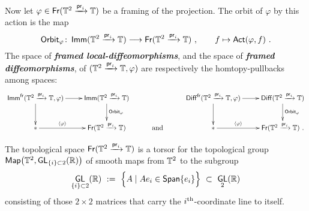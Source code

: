 \documentclass{amsart}
\theoremstyle{definition}
\theoremstyle{remark}
\DeclareMathOperator{\pr}{\mathsf{pr}}
\DeclareMathOperator{\Map}{{\sf Map}}
\newcommand{\bit}[1]{\textbf{\textit{#1}}}
\DeclareMathOperator{\Diff}{{\sf Diff}}
\newcommand{\lag}{\langle}
\newcommand{\rag}{\rangle}
\newcommand{\xra}{\xrightarrow}
\DeclareMathOperator{\GL}{\sf GL}
\DeclareMathOperator{\Fr}{\sf Fr}
\DeclareMathOperator{\Act}{\sf Act}
\DeclareMathOperator{\Imm}{\sf Imm}
\begin{document}
Now let $\varphi \in \Fr(\TT^2 \xra{\pr_i} \TT)$ be a framing of the projection.
The orbit of $\varphi$ by this action is the map
\[
{\sf Orbit}_\varphi
\colon 
\Imm(\TT^2 \xra{\pr_i}\TT)
\longrightarrow
\Fr(\TT^2 \xra{\pr_i} \TT)
~,\qquad
f\mapsto \Act(\varphi,f)
~.
\]
The space of \bit{framed local-diffeomorphisms}, and the space of \bit{framed diffeomorphisms}, of $(\TT^2 \xra{\pr_i} \TT , \varphi)$ are respectively the homtopy-pullbacks among spaces:
\[
\xymatrix{
\Imm^{\sf fr}(\TT^2\xra{\pr_i} \TT,\varphi)
\ar[r]
\ar[d]
&
\Imm(\TT^2\xra{\pr_i} \TT)
\ar[d]^-{{\sf Orbit}_\varphi}
&&
\Diff^{\sf fr}(\TT^2 \xra{\pr_i} \TT,\varphi)
\ar[r]
\ar[d]
&
\Diff(\TT^2\xra{\pr_i} \TT)
\ar[d]^-{{\sf Orbit}_\varphi}
\\
\ast
\ar[r]^-{\lag \varphi \rag}
&
\Fr(\TT^2\xra{\pr_i} \TT)
&
\text{ and }
&
\ast
\ar[r]^-{\lag \varphi \rag}
&
\Fr(\TT^2\xra{\pr_i} \TT)
~.
}
\]

The topological space $\Fr(\TT^2 \xra{\pr_i} \TT)$ is a torsor for the topological group $\Map\bigl( \TT^2 , \GL_{\{i\}\subset 2}(\RR) \bigr)$ of smooth maps from $\mathbb T^2$ to the subgroup 
\[
\GL_{\{i\}\subset 2}(\RR)
~:=~
\Bigl\{
A \mid
Ae_i \in {\sf Span}\{e_i\}
\Bigr\}
~\subset~
\GL_2(\RR)
\]
consisting of those $2 \times 2$ matrices that carry the $i^{\rm th}$-coordinate line to itself. 
\end{document}
